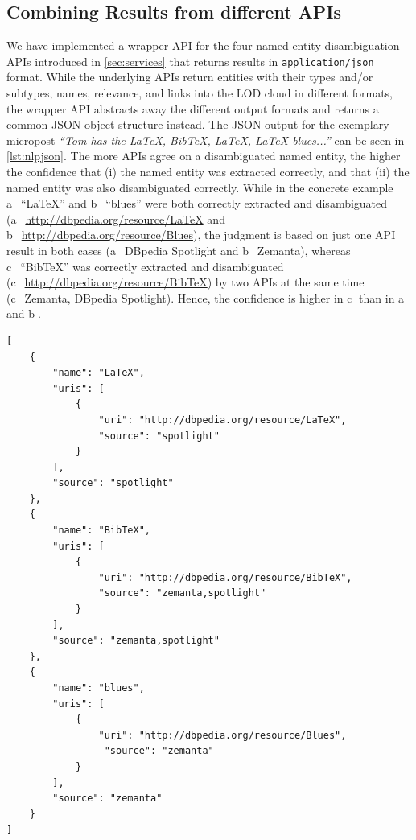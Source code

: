 \documentclass{iosart2c}
\begin{document}
\subsection{Combining Results from different APIs} \label{sec:consolidation-nlp}
We have implemented a wrapper API for the four named entity disambiguation APIs introduced in \autoref{sec:services} that returns results in \texttt{application/json} format.
While the underlying APIs return entities with their types and/or subtypes, names, relevance, and links into the LOD cloud in different formats, the wrapper API abstracts away the different output formats and returns a common JSON object structure instead.
The JSON output for the exemplary micropost \textit{``Tom has the LaTeX, BibTeX, LaTeX, LaTeX blues...''} can be seen in \autoref{lst:nlpjson}.
The more APIs agree on a disambiguated named entity, the higher the confidence that (i) the named entity was extracted correctly, and that (ii) the named entity was also disambiguated correctly.
While  in the concrete example \textcircled{a}~``LaTeX'' and \textcircled{b}~``blues'' were both correctly extracted and disambiguated (\textcircled{a}~\url{http://dbpedia.org/resource/LaTeX} and \textcircled{b}~\url{http://dbpedia.org/resource/Blues}), the judgment is based on just one API result in both cases (\textcircled{a}~DBpedia Spotlight and \textcircled{b}~Zemanta),
whereas \textcircled{c}~``BibTeX'' was correctly extracted and disambiguated (\textcircled{c}~\url{http://dbpedia.org/resource/BibTeX}) by two APIs at the same time (\textcircled{c}~Zemanta, DBpedia Spotlight).
Hence, the confidence is higher in \textcircled{c} than in \textcircled{a} and \textcircled{b}.

\begin{lstlisting}[caption={Named entity disambiguation wrapper API output in JSON format for the exemplary micropost \textit{``Tom has the LaTeX, BibTeX, LaTeX, LaTeX blues...''}.},label={lst:nlpjson}]
[
    {
        "name": "LaTeX",
        "uris": [
            {
                "uri": "http://dbpedia.org/resource/LaTeX",
                "source": "spotlight"
            }
        ],
        "source": "spotlight"
    },
    {
        "name": "BibTeX",
        "uris": [
            {
                "uri": "http://dbpedia.org/resource/BibTeX",
                "source": "zemanta,spotlight"
            }
        ],
        "source": "zemanta,spotlight"
    },
    {
        "name": "blues",
        "uris": [
            {
                "uri": "http://dbpedia.org/resource/Blues",
                 "source": "zemanta"
            }
        ],
        "source": "zemanta"
    }    
]
\end{lstlisting}
\end{document}
